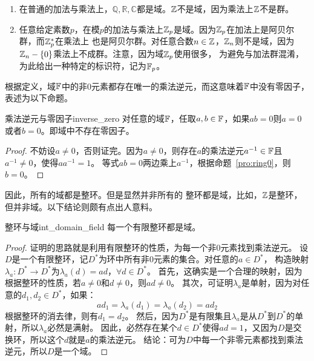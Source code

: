\begin{example}
\begin{enumerate} 
\item 在普通的加法与乘法上，$\mathbb{Q}, \mathbb{R}, \mathbb{C}$都是域。${\mathbb Z}$不是域，因为乘法上${\mathbb Z}$不是群。

\item 任意给定素数$p$，在模$p$的加法与乘法上${\mathbb Z}_p$是域。因为${\mathbb Z}_p$在加法上是阿贝尔群，而${\mathbb Z}_p^*$在乘法上
也是阿贝尔群。对任意合数$n\in {\mathbb Z}$，${\mathbb Z}_n$则不是域，因为${\mathbb Z}_n - \{ 0\}$乘法上不成群。注意，因为域${\mathbb Z}_p$使用很多，
为避免与加法群混淆，为此给出一种特定的标识符，记为${\mathbb F}_p$。
\end{enumerate}
\end{example}

根据定义，域${\mathbb F}$中的非$0$元素都存在唯一的乘法逆元，而这意味着${\mathbb F}$中没有零因子，表述为以下命题。
\begin{proposition}{乘法逆元与零因子}{inverse_zero}
对任意的域${\mathbb F}$，任取$a, b \in {\mathbb F}$，如果$ab = 0$则$a = 0$或者$b = 0$。即域中不存在零因子。
\end{proposition}

\begin{proof}
不妨设$a \neq 0$，否则证完。因为$a \neq 0$，则存在$a$的乘法逆元$a^{-1} \in {\mathbb F}$且$a^{-1} \neq 0$，使得$a a^{-1} =1$。
等式$ab = 0$两边乘上$a^{-1}$，根据命题~\ref{pro:ring0}，则$b = 0$。
\end{proof}
因此，所有的域都是整环。但是显然并非所有的
整环都是域，比如，${\mathbb Z}$是整环，但并非域。以下结论则颇有点出人意料。

\begin{proposition}{整环与域}{int_domain_field}
每一个有限整环都是域。
\end{proposition}

\begin{proof}
证明的思路就是利用有限整环的性质，为每一个非$0$元素找到乘法逆元。
设$D$是一个有限整环，记$D^*$为环中所有非$0$元素的集合。对任意的$a \in D^*$，
构造映射$\lambda_a\colon D^* \to D^*$为$\lambda_a(d) = ad$，$\forall d \in D^*$。
首先，这确实是一个合理的映射，因为根据整环的性质，若$a \neq 0$和$d \neq 0$，则$ad \neq 0$。
其次，可证明$\lambda_a$是单射，因为对任意的$d_1, d_2 \in D^*$，如果：
\[ad_1 = \lambda_a(d_1) = \lambda_a(d_2) = a d_2\]
根据整环的消去律，则有$d_1 = d_2$。
然后，因为$D^*$是有限集且$\lambda_a$是从$D^*$到$D^*$的单射，所以$\lambda_a$必然是满射。
因此，必然存在某个$d\in D^*$使得$ad = 1$，又因为$D$是交换环，所以这个$d$就是$a$的乘法逆元。
结论：可为$D$中每一个非零元素都找到乘法逆元，所以$D$是一个域。
\end{proof}

